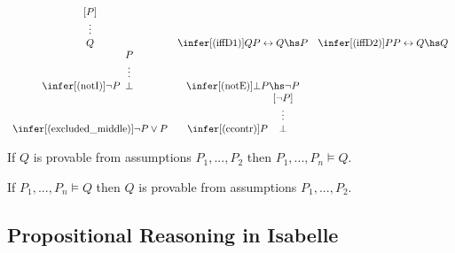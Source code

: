 \documentclass{article}
\begin{document}
\begin{definition}
\begin{align*}
\begin{array}{c c c}
{\begin{array}[b]{c}
                    [P] \\\vdots\\Q
                \end{array}} &
            \infer[(\text{iffD1})]{Q}{P\leftrightarrow Q\hs P}                                                 &
            \infer[(\text{iffD2})]{P}{P\leftrightarrow Q\hs Q}                                                   \\
            \infer[(\text{notI})]{\neg P}{\begin{array}[b]{c}
                    P \\ \vdots \\ \bot
                \end{array}}                                          &
            \infer[(\text{notE})]{\bot}{P\hs\neg P}                                                            & \\
            \infer[(\text{excluded\_middle})]{\neg P \vee P}{}                                                 &
            \infer[\text{(ccontr)}]{P}{\begin{array}[b]{c}
                    [\neg P] \\ \vdots \\ \bot
                \end{array}}
        \end{array}
    \end{align*}
\end{definition}

\begin{theorem}[Soundness]
    If $Q$ is provable from assumptions $P_1,...,P_2$ then $P_1,...,P_n\vDash Q$.
\end{theorem}
\begin{theorem}[Completeness]
    If $P_1,...,P_n\vDash Q$ then $Q$ is provable from assumptions $P_1,...,P_2$.
\end{theorem}

\subsection{Propositional Reasoning in Isabelle}

\newcommand{\db}[1]{[\![#1]\!]}
\end{document}
